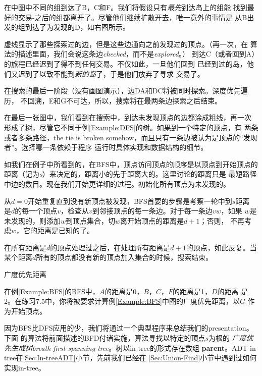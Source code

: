 \begin{example}
\begin{tikzpicture}[scale=1.2,place/.style={circle,draw, fill=white,inner sep=0pt,minimum size=4mm}]
    \end{tikzpicture}
在中图中不同的组到达了B，C和F。我们将假设只有\emph{最先}到达岛上的组能
找到最好的交易-之后的组都离开了。尽管他们继续扩散开去，唯一意外的事情是
从B出发的组到达了为发现的D，如右图所示。

虚线显示了那些探索过的边，但是这些边通向之前发现过的顶点。（再一次，在
算法的描述里面，我们会说这条边\emph{checked}，而不是\emph{explored}。）
到达C（或者回到A）的旅程已经迟到了得不到任何交易。不仅如此，一旦他们回到
已经到过的岛，他们又迟到了以致不能到\emph{新的岛}了，于是他们放弃了寻求
交易了。

在搜索的最后一阶段（没有画图演示），边DA和DC将被同时探索。深度优先遍历，
不回溯，E和G不可达，所以，搜索将在最两条边探索之后结束。

在最后一张图中，我们看到在搜索中，到达未发现顶点的边都涂成粗线，再一次
形成了树，尽管它不同于例\ref{Example:DFS}的树。如果到一个特定的顶点，有
两条或者多条路径，the tie is broken
somehow，而且只有一条边被认为是顶点的“发现者”。选择哪一条依赖于程序
运行时具体实现和数据结构的细节。
\end{example}

如我们在例子中所看到的，在BFS中，顶点访问顶点的顺序是以顶点到开始顶点的
距离（记为\emph{s}）来决定的，距离小的先于距离大的。这里讨论的距离只是
最短路径中边的数目。现在我们开始更详细的过程。初始化所有顶点为未发现的。

从$d=0$开始重复直到没有新顶点被发现，BFS首要的步骤是考察一轮中到$s$距离
是$d$的每一个顶点$v$，检查从$v$到邻接顶点的每一条边。对于每一条边$vw$，如果
$w$是未发现的，则添加$w$到顶点集合，切$w$离开始顶点的距离是$d+1$；否则，
不再考虑$w$，它的距离是已知的了。

在所有距离是$d$的顶点处理过之后，在处理所有距离是$d+1$的顶点，如此反复。当
某个距离$d$所有的顶点都没有新的顶点加入集合的时候，搜索结束。

\begin{example}
广度优先距离

在例\ref{Example:BFS}的BFS中，$A$的距离是0，$B$，$C$，$F$的距离是1，$D$的距离
是2。在练习7.5中，你将被要求计算例\ref{Example:BFS}中图的广度优先距离，以$G$
作为开始顶点。
\end{example}

因为BFS比DFS应用的少，我们将通过一个典型程序来总结我们的presentation。下面
的算法将前面描述的BFD付诸实施，算法寻找以特定的顶点$s$为根的
\emph{广度优先生成树breath-first spanning tree}。树以in-tree的形式存在数组
{\textbf{parent}}。ADT in-tree在\ref{Sec:In-treeADT}小节，先前我们已经在
\ref{Sec:Union-Find}小节中遇到过如何实现in-tree。

